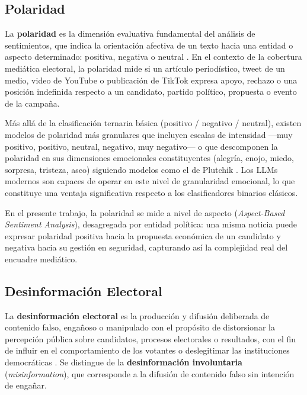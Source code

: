 \subsection{Polaridad}

La \textbf{polaridad} es la dimensión evaluativa fundamental del análisis de sentimientos, que indica la orientación afectiva de un texto hacia una entidad o aspecto determinado: positiva, negativa o neutral \parencite{tec_liu2012sentiment}. En el contexto de la cobertura mediática electoral, la polaridad mide si un artículo periodístico, tweet de un medio, video de YouTube o publicación de TikTok expresa apoyo, rechazo o una posición indefinida respecto a un candidato, partido político, propuesta o evento de la campaña.

Más allá de la clasificación ternaria básica (positivo / negativo / neutral), existen modelos de polaridad más granulares que incluyen escalas de intensidad —muy positivo, positivo, neutral, negativo, muy negativo— o que descomponen la polaridad en sus dimensiones emocionales constituyentes (alegría, enojo, miedo, sorpresa, tristeza, asco) siguiendo modelos como el de Plutchik \parencite{mc_plutchik1980emotion}. Los LLMs modernos son capaces de operar en este nivel de granularidad emocional, lo que constituye una ventaja significativa respecto a los clasificadores binarios clásicos.

En el presente trabajo, la polaridad se mide a nivel de aspecto (\textit{Aspect-Based Sentiment Analysis}), desagregada por entidad política: una misma noticia puede expresar polaridad positiva hacia la propuesta económica de un candidato y negativa hacia su gestión en seguridad, capturando así la complejidad real del encuadre mediático.

\subsection{Desinformación Electoral}

La \textbf{desinformación electoral} es la producción y difusión deliberada de contenido falso, engañoso o manipulado con el propósito de distorsionar la percepción pública sobre candidatos, procesos electorales o resultados, con el fin de influir en el comportamiento de los votantes o deslegitimar las instituciones democráticas \parencite{mc_wardle2017information}. Se distingue de la \textbf{desinformación involuntaria} (\textit{misinformation}), que corresponde a la difusión de contenido falso sin intención de engañar.

